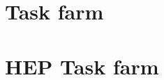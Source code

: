 \documentclass{article}
\begin{document}
\section{Task farm}
\label{sec: task farm source}


\section{HEP Task farm}
\label{sec: task farm hep source}

\end{document}
